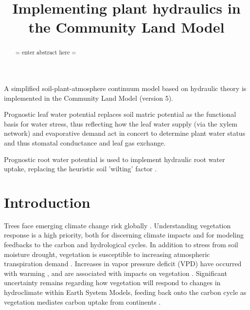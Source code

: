 \documentclass[draft,linenumbers]{agujournal}
\begin{document}
\title{Implementing plant hydraulics in the Community Land Model}



\begin{keypoints}
\item A simplified soil-plant-atmosphere continuum model based on hydraulic theory is implemented in the Community Land Model (version 5).
\item Prognostic leaf water potential replaces soil matric potential as the functional basis for water stress, thus reflecting how the leaf water supply (via the xylem network) and evaporative demand act in concert to determine plant water status and thus stomatal conductance and leaf gas exchange. 
\item Prognostic root water potential is used to implement hydraulic root water uptake, replacing the heuristic soil 'wilting' factor .
\end{keypoints}



\begin{abstract}
= enter abstract here =
\end{abstract}


\section{Introduction}

Trees face emerging climate change risk globally \citep{allen2010,anderegg2013b}.
Understanding vegetation response is a high priority, both for discerning climate impacts and for modeling feedbacks to the carbon and hydrological cycles.
In addition to stress from soil moisture drought, vegetation is susceptible to increasing atmospheric transpiration demand \citep{restaino2016,novick2016b}.
Increases in vapor pressure deficit (VPD) have occurred with warming \citep{ficklin2017,seager2015}, and are associated with impacts on vegetation \citep{williams2013,mcdowell2015}.
Significant uncertainty remains regarding how vegetation will respond to changes in hydroclimate within Earth System Models, feeding back onto the carbon cycle as vegetation mediates carbon uptake from continents \citep{dekauwe2017,friedlingstein2014}.
\end{document}

